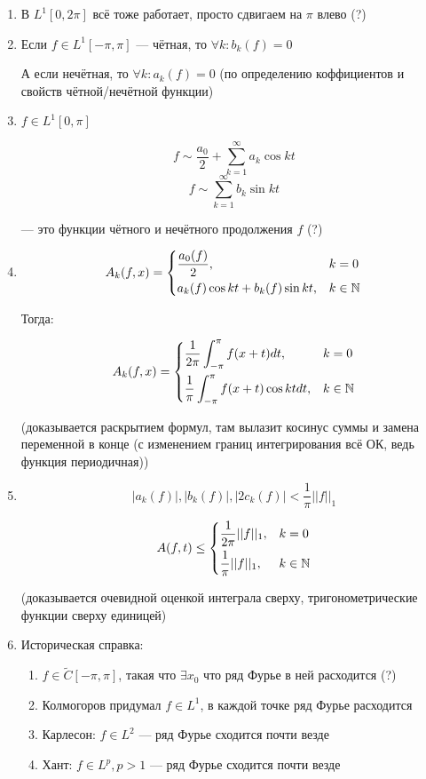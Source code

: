 \documentclass{article}
\begin{document}
\begin{enumerate}
    \item В $L^1[0, 2\pi]$ всё тоже работает, просто сдвигаем на $\pi$ влево (?)
    \item Если $f \in L^1[-\pi, \pi]$ --- чётная, то $\forall k : b_k(f) = 0$
    
    А если нечётная, то $\forall k : a_k(f) = 0$ (по определению коффициентов и свойств чётной/нечётной функции)

    \item $f \in L^1[0, \pi]$
    
    \[f \sim \frac{a_0}{2} + \sum_{k = 1}^{\infty} a_k \cos kt\]
    \[f \sim \sum_{k = 1}^{\infty} b_k \sin kt\]

    --- это функции чётного и нечётного продолжения $f$ (?)

    \item \[A_k(f, x) = \begin{dcases}
        \frac{a_0(f)}{2}, & k = 0 \\
        a_k(f) \cos kt + b_k(f) \sin kt, & k \in \mathbb{N}
    \end{dcases}\]

    Тогда:

    \[A_k(f, x) = \begin{dcases}
        \frac{1}{2\pi} \int_{-\pi}^{\pi} f(x + t) dt, & k = 0 \\
        \frac{1}{\pi} \int_{-\pi}^{\pi} f(x + t) \cos kt dt, & k \in \mathbb{N}
    \end{dcases}\]

    (доказывается раскрытием формул, там вылазит косинус суммы и замена переменной в конце (с изменением границ интегрирования всё ОК, ведь функция периодичная))

    \item 
    
    \[|a_k(f)|, |b_k(f)|, |2c_k(f)| < \frac{1}{\pi}||f||_1\]

    \[A(f, t) \le \begin{dcases}
        \frac{1}{2\pi}||f||_1, & k = 0 \\
        \frac{1}{\pi} ||f||_1, & k \in \mathbb{N}
    \end{dcases}\]

    (доказывается очевидной оценкой интеграла сверху, тригонометрические функции сверху единицей)

    \item Историческая справка:
    \begin{enumerate}
        \item $f \in \tilde{C}[-\pi, \pi]$, такая что $\exists x_0$ что ряд Фурье в ней расходится (?)
        \item Колмогоров придумал $f \in L^1$, в каждой точке ряд Фурье расходится
        \item Карлесон: $f \in L^2$ --- ряд Фурье сходится почти везде
        \item Хант: $f \in L^p, p > 1$ --- ряд Фурье сходится почти везде
    \end{enumerate}
\end{enumerate}
\end{document}
